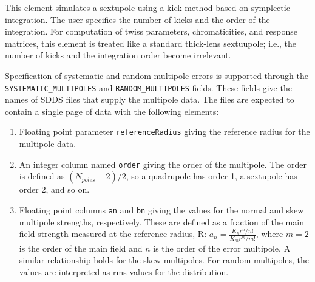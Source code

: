 This element simulates a sextupole using a kick method based on
symplectic integration.  The user specifies the number of kicks and
the order of the integration.  For computation of twiss parameters,
chromaticities, and response matrices, this element is treated like a
standard thick-lens sextuupole; i.e., the number of kicks and the
integration order become irrelevant.

\begin{raggedright}
Specification of systematic and random multipole errors is supported
through the \verb|SYSTEMATIC_MULTIPOLES| and 
\verb|RANDOM_MULTIPOLES|
fields.  These fields give the names of SDDS files that supply the
multipole data.  The files are expected to contain a single page of
data with the following elements:
\end{raggedright}
\begin{enumerate}
\item Floating point parameter {\tt referenceRadius} giving the reference
 radius for the multipole data.
\item An integer column named {\tt order} giving the order of the multipole.
The order is defined as $(N_{poles}-2)/2$, so a quadrupole has order 1, a
sextupole has order 2, and so on.
\item Floating point columns {\tt an} and {\tt bn} giving the values for the
normal and skew multipole strengths, respectively.  These are defined as a fraction 
of the main field strength measured at the reference radius, R: 
$a_n  = \frac{K_n r^n / n!}{K_m r^m / m!}$, where 
$m=2$ is the order of the main field and $n$ is the order of the error multipole.
A similar relationship holds for the skew multipoles.
For random multipoles, the values are interpreted as rms values for the distribution.
\end{enumerate}

